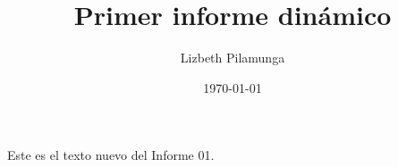 \documentclass[12pt,a4paper]{book}
\title{Primer informe dinámico}
\author{Lizbeth Pilamunga}
\date{\today}
\begin{document}
\maketitle

Este es el texto nuevo del Informe 01.
\end{document}

